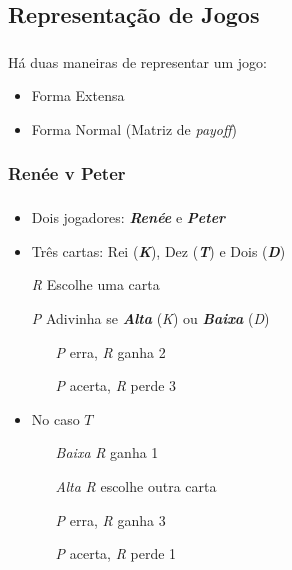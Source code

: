 \subsection{Representação de Jogos}
\begin{frame}
\frametitle{\secname}
Há duas maneiras de representar um jogo:
\begin{itemize}
	\item Forma Extensa
	\item Forma Normal (Matriz de \emph{payoff})
\end{itemize}
\end{frame}

\subsubsection*{Renée v Peter}
\begin{frame}
\frametitle{\subsecname}
\begin{itemize}
	\item Dois jogadores: \textbf{\emph{Renée}} e \textbf{\emph{Peter}}
	\pause
	\item Três cartas: Rei (\textbf{\emph{K}}), Dez (\textbf{\emph{T}}) e Dois (\textbf{\emph{D}})
	\pause
	\item[\emph{R}] Escolhe uma carta
	\pause
	\item[\emph{P}] Adivinha se \emph{\textbf{Alta}} (\emph{K}) ou \emph{\textbf{Baixa}} (\emph{D})
	\pause
	\begin{itemize}
		\item[\emph{P}] erra, \emph{R} ganha 2
		\pause
		\item[\emph{P}] acerta, \emph{R} perde 3
	\end{itemize}
	\pause
	\item No caso $T$
	\pause
	\begin{itemize}
		\item[\emph{Baixa}] \emph{R} ganha 1
		\pause
		\item[\emph{Alta}] \emph{R} escolhe outra carta
	\end{itemize}
	\pause
	\begin{itemize}
		\item[\emph{P}] erra, \emph{R} ganha 3
		\pause
		\item[\emph{P}] acerta, \emph{R} perde 1
	\end{itemize}
\end{itemize}
\end{frame}

